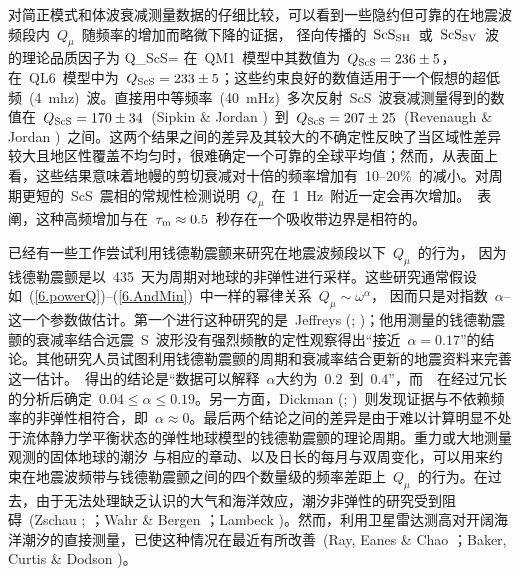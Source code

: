对简正模式和体波衰减测量数据的仔细比较，可以看到一些隐约但可靠的在地震波频段内~$Q_{\mu}$~随频率的增加而略微下降的证据，
%
径向传播的~${\rm ScS}_{\rm SH}$~或~${\rm ScS}_{\rm SV}$~波的理论品质因子为
\eq
Q_{\rm ScS}=
\en
在~QM1~模型中其数值为~$Q_{\rm ScS}=236\pm 5$，在~QL6~模型中为~$Q_{\rm ScS}=233\pm 5$；这些约束良好的数值适用于一个假想的超低频~(4~mhz)~波。直接用中等频率~(40~mHz)~多次反射~ScS~波衰减测量得到的数值在~$Q_{\rm ScS}=170\pm 34$~(Sipkin \& Jordan \citeyear{sipkin&jordan80})~到~$Q_{\rm ScS}=207\pm 25$~(Revenaugh \& Jordan \citeyear{revenaugh&jordan91})~之间。这两个结果之间的差异及其较大的不确定性反映了当区域性差异较大且地区性覆盖不均匀时，很难确定一个可靠的全球平均值；然而，从表面上看，这些结果意味着地幔的剪切衰减对十倍的频率增加有~10--20\%~的减小。对周期更短的~ScS~震相的常规性检测说明~$Q_{\mu}$~在~1~Hz~附近一定会再次增加。\textcite{sipkin&jordan79}~表阐，这种高频增加与在~$\tau_{\rm m}\approx 0.5$~秒存在一个吸收带边界是相符的。

已经有一些工作尝试利用钱德勒震颤来研究在地震波频段以下~$Q_{\mu}$~的行为，
%
因为钱德勒震颤是以~435~天为周期对地球的非弹性进行采样。这些研究通常假设如~(\ref{6.powerQ})--(\ref{6.AndMin})~中一样的幂律关系~$Q_{\mu}\sim\omega^{\alpha}$，
%
因而只是对指数~$\alpha$--这一个参数做估计。第一个进行这种研究的是~Jeffreys (\citeyear{jeffreys58a};
\citeyear{jeffreys58b})；他用测量的钱德勒震颤的衰减率结合远震~S~波形没有强烈频散的定性观察得出“接近~$\alpha=0.17$”的结论。其他研究人员试图利用钱德勒震颤的周期和衰减率结合更新的地震资料来完善这一估计。\textcite{anderson&minster79}~得出的结论是“数据可以解释~$\alpha$大约为~0.2~到~0.4”，而~\textcite{smith&dahlen81}~在经过冗长的分析后确定~$0.04\leq\alpha\leq 0.19$。另一方面，Dickman (\citeyear{dickman88}; \citeyear{dickman93})~则发现证据与不依赖频率的非弹性相符合，即~$\alpha\approx 0$。最后两个结论之间的差异是由于难以计算明显不处于流体静力学平衡状态的弹性地球模型的钱德勒震颤的理论周期。重力或大地测量观测的固体地球的潮汐
与相应的章动、以及日长的每月与双周变化，可以用来约束在地震波频带与钱德勒震颤之间的四个数量级的频率差距上~$Q_{\mu}$~的行为。在过去，由于无法处理缺乏认识的大气和海洋效应，潮汐非弹性的研究受到阻碍~(Zschau \citeyear{zschau78}; \citeyear{zschau86}；Wahr \& Bergen \citeyear{wahr&bergen86}；Lambeck \citeyear{lambeck88})。然而，利用卫星雷达测高对开阔海洋潮汐的直接测量，已使这种情况在最近有所改善~(Ray, Eanes \& Chao \citeyear{ray&al96}；Baker, Curtis \& Dodson \citeyear{baker&al96})。
%
%
%
%
%

